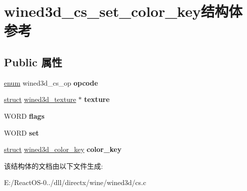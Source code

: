 \hypertarget{structwined3d__cs__set__color__key}{}\section{wined3d\+\_\+cs\+\_\+set\+\_\+color\+\_\+key结构体 参考}
\label{structwined3d__cs__set__color__key}
\subsection*{Public 属性}
\begin{DoxyCompactItemize}
\item 
\mbox{\label{structwined3d__cs__set__color__key_ac4390603a97e5b196cdeb0b2bd6b1756}} 
\hyperlink{interfaceenum}{enum} wined3d\+\_\+cs\+\_\+op {\bfseries opcode}
\item 
\mbox{\label{structwined3d__cs__set__color__key_acae58dc8aaeca374881451f1aab98132}} 
\hyperlink{interfacestruct}{struct} \hyperlink{structwined3d__texture}{wined3d\+\_\+texture} $\ast$ {\bfseries texture}
\item 
\mbox{\label{structwined3d__cs__set__color__key_a1993e420d5d96cbd638b40ccacf63805}} 
W\+O\+RD {\bfseries flags}
\item 
\mbox{\label{structwined3d__cs__set__color__key_ab4c31978732f0eb2a8f997c26be5c700}} 
W\+O\+RD {\bfseries set}
\item 
\mbox{\label{structwined3d__cs__set__color__key_aa2da4893aae63e54fbbfcf0da82333e0}} 
\hyperlink{interfacestruct}{struct} \hyperlink{structwined3d__color__key}{wined3d\+\_\+color\+\_\+key} {\bfseries color\+\_\+key}
\end{DoxyCompactItemize}


该结构体的文档由以下文件生成\+:\begin{DoxyCompactItemize}
\item 
E\+:/\+React\+O\+S-\/0../dll/directx/wine/wined3d/cs.\+c\end{DoxyCompactItemize}
